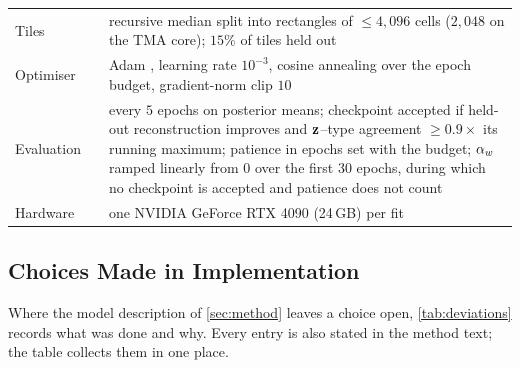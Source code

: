 \begin{table}[t]
\begin{tabular}{@{}p{}p{}p{}@{}}
\midrule
Tiles & & recursive median split into rectangles of $\leq 4{,}096$ cells ($2{,}048$ on the TMA core); $15\%$ of tiles held out \\
Optimiser & & Adam \citep{kingma2015adam}, learning rate $10^{-3}$, cosine annealing \citep{loshchilov2017} over the epoch budget, gradient-norm clip $10$ \\
Evaluation & & every $5$ epochs on posterior means; checkpoint accepted if held-out reconstruction improves and $\mathbf{z}$--type agreement $\geq 0.9\times$ its running maximum; patience in epochs set with the budget; $\alpha_w$ ramped linearly from $0$ over the first $30$ epochs, during which no checkpoint is accepted and patience does not count \\
Hardware & & one NVIDIA GeForce RTX 4090 (24\,GB) per fit \\
\bottomrule
\end{tabular}
\end{table}

\subsection{Choices Made in Implementation}
\label{app:deviations}

 Where the model description of \cref{sec:method} leaves a choice open, \cref{tab:deviations} records what was done and why. Every entry is also stated in the method text; the table collects them in one place. 


